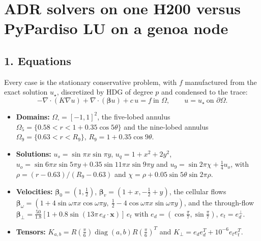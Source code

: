 \documentclass[10pt,a4paper]{article}
\begin{document}
\section*{ADR solvers on one H200 versus PyPardiso LU on a genoa node}

\subsection*{1. Equations}

Every case is the stationary conservative problem, with $f$ manufactured from the exact solution
$u_\star$, discretized by HDG of degree $p$ and condensed to the trace:
\begin{equation}
 -\nabla\cdot(K\nabla u)+\nabla\cdot(\boldsymbol\beta u)+c\,u=f\ \text{in }\Omega,\qquad
 u=u_\star\ \text{on }\partial\Omega.
 \label{eq:adr-h200-problem}
\end{equation}
\begin{itemize}
\item \textbf{Domains:} $\Omega_\square=[-1,1]^2$, the five-lobed annulus
  $\Omega_5=\{0.58<r<1+0.35\cos5\theta\}$ and the nine-lobed annulus
  $\Omega_9=\{0.63<r<R_9\}$, $R_9=1+0.35\cos9\theta$.
\item \textbf{Solutions:} $u_s=\sin\pi x\sin\pi y$, $u_q=1+x^2+2y^2$,
  $u_o=\sin6\pi x\sin5\pi y+0.35\sin11\pi x\sin9\pi y$ and
  $u_9=\sin2\pi\chi+\tfrac14u_o$, with $\rho=(r-0.63)/(R_9-0.63)$ and
  $\chi=\rho+0.05\sin5\theta\sin2\pi\rho$.
\item \textbf{Velocities:} $\boldsymbol\beta_0=(1,\tfrac12)$, $\boldsymbol\beta_v=(1+x,-\tfrac12+y)$,
  the cellular flows
  $\boldsymbol\beta_\omega=(1+4\sin\omega\pi x\cos\omega\pi y,\ \tfrac12-4\cos\omega\pi x\sin\omega\pi y)$,
  and the through-flow $\boldsymbol\beta_\perp=\tfrac{50}{1.8}[1+0.8\sin(13\pi\,e_d\cdot\boldsymbol x)]\,e_t$
  with $e_d=(\cos\tfrac\pi7,\sin\tfrac\pi7)$, $e_t=e_d^\perp$.
\item \textbf{Tensors:} $K_{a,b}=R(\tfrac\pi6)\operatorname{diag}(a,b)R(\tfrac\pi6)^T$ and
  $K_\perp=e_de_d^T+10^{-6}e_te_t^T$.
\end{itemize}
\end{document}
